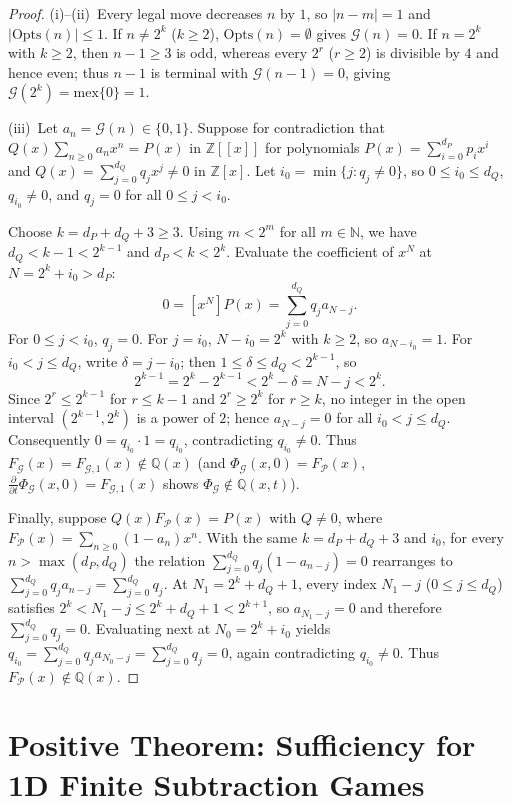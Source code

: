 \documentclass[11pt]{article}
\theoremstyle{definition}
\theoremstyle{remark}
\newcommand{\N}{\mathbb{N}}
\newcommand{\Z}{\mathbb{Z}}
\newcommand{\Q}{\mathbb{Q}}
\newcommand{\G}{\mathcal{G}}
\newcommand{\Ppos}{\mathcal{P}}
\newcommand{\mex}{\mathrm{mex}}
\newcommand{\Opts}{\mathrm{Opts}}
\begin{document}
\begin{proof}
(i)--(ii)~Every legal move decreases $n$ by $1$, so $|n-m|=1$ and $|\Opts(n)| \le 1$. If $n \neq 2^k$ ($k \ge 2$), $\Opts(n)=\emptyset$ gives $\G(n)=0$. If $n = 2^k$ with $k \ge 2$, then $n - 1 \ge 3$ is odd, whereas every $2^r$ ($r \ge 2$) is divisible by $4$ and hence even; thus $n - 1$ is terminal with $\G(n-1)=0$, giving $\G(2^k) = \mex\{0\} = 1$.

(iii)~Let $a_n = \G(n) \in \{0,1\}$. Suppose for contradiction that $Q(x) \sum_{n \ge 0} a_n x^n = P(x)$ in $\Z[[x]]$ for polynomials $P(x) = \sum_{i=0}^{d_P} p_i x^i$ and $Q(x) = \sum_{j=0}^{d_Q} q_j x^j \neq 0$ in $\Z[x]$. Let $i_0 = \min\{j : q_j \neq 0\}$, so $0 \le i_0 \le d_Q$, $q_{i_0} \neq 0$, and $q_j = 0$ for all $0 \le j < i_0$.

Choose $k = d_P + d_Q + 3 \ge 3$. Using $m < 2^m$ for all $m \in \N$, we have $d_Q < k - 1 < 2^{k-1}$ and $d_P < k < 2^k$. Evaluate the coefficient of $x^N$ at $N = 2^k + i_0 > d_P$:
\[
  0 = [x^N]P(x) = \sum_{j=0}^{d_Q} q_j a_{N - j}.
\]
For $0 \le j < i_0$, $q_j = 0$. For $j = i_0$, $N - i_0 = 2^k$ with $k \ge 2$, so $a_{N-i_0} = 1$. For $i_0 < j \le d_Q$, write $\delta = j - i_0$; then $1 \le \delta \le d_Q < 2^{k-1}$, so
\[
  2^{k-1} = 2^k - 2^{k-1} < 2^k - \delta = N - j < 2^k.
\]
Since $2^r \le 2^{k-1}$ for $r \le k-1$ and $2^r \ge 2^k$ for $r \ge k$, no integer in the open interval $(2^{k-1}, 2^k)$ is a power of $2$; hence $a_{N-j} = 0$ for all $i_0 < j \le d_Q$. Consequently $0 = q_{i_0} \cdot 1 = q_{i_0}$, contradicting $q_{i_0} \neq 0$. Thus $F_{\G}(x) = F_{\G,1}(x) \notin \Q(x)$ (and $\Phi_{\G}(x,0) = F_{\Ppos}(x)$, $\frac{\partial}{\partial t}\Phi_{\G}(x,0) = F_{\G,1}(x)$ shows $\Phi_{\G} \notin \Q(x,t)$).

Finally, suppose $Q(x) F_{\Ppos}(x) = P(x)$ with $Q \neq 0$, where $F_{\Ppos}(x) = \sum_{n \ge 0} (1 - a_n) x^n$. With the same $k = d_P + d_Q + 3$ and $i_0$, for every $n > \max(d_P, d_Q)$ the relation $\sum_{j=0}^{d_Q} q_j (1 - a_{n-j}) = 0$ rearranges to $\sum_{j=0}^{d_Q} q_j a_{n-j} = \sum_{j=0}^{d_Q} q_j$. At $N_1 = 2^k + d_Q + 1$, every index $N_1 - j$ ($0 \le j \le d_Q$) satisfies $2^k < N_1 - j \le 2^k + d_Q + 1 < 2^{k+1}$, so $a_{N_1 - j} = 0$ and therefore $\sum_{j=0}^{d_Q} q_j = 0$. Evaluating next at $N_0 = 2^k + i_0$ yields $q_{i_0} = \sum_{j=0}^{d_Q} q_j a_{N_0 - j} = \sum_{j=0}^{d_Q} q_j = 0$, again contradicting $q_{i_0} \neq 0$. Thus $F_{\Ppos}(x) \notin \Q(x)$.
\end{proof}

\section{Positive Theorem: Sufficiency for 1D Finite Subtraction Games}
\label{sec:positive}
\end{document}

